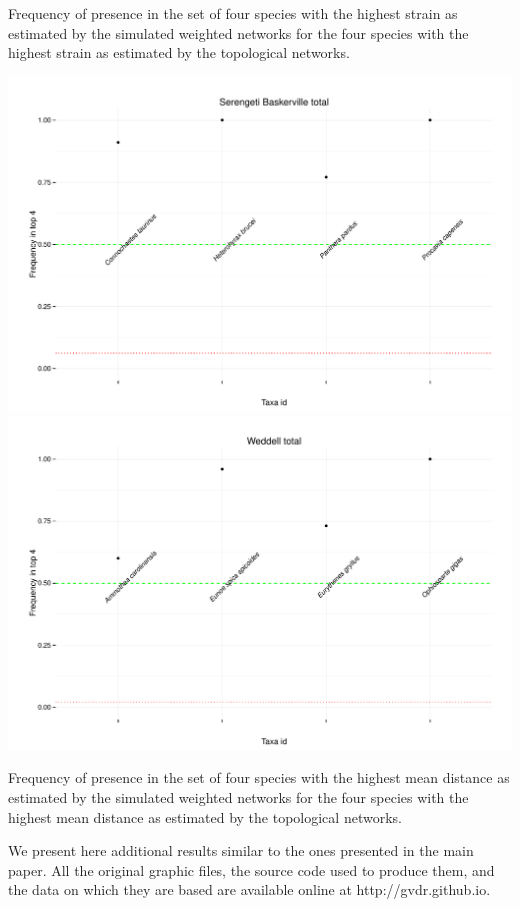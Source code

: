 \documentclass[11pt,article,oneside]{memoir}
\makeatletter
\def\maxwidth{\ifdim\Gin@nat@width>\linewidth\linewidth
\else\Gin@nat@width\fi}
\let\Oldincludegraphics\includegraphics
\renewcommand{\includegraphics}[1]{\Oldincludegraphics[width=\maxwidth]{#1}}
\makeatother
\begin{document}
Frequency of presence in the set of four species with the highest strain
as estimated by the simulated weighted networks for the four species
with the highest strain as estimated by the topological networks.

\newpage

\includegraphics{Images/meand_weight/Serengeti_Baskerville_total.pdf}
\includegraphics{Images/meand_weight/Weddell_total.pdf}

Frequency of presence in the set of four species with the highest mean
distance as estimated by the simulated weighted networks for the four
species with the highest mean distance as estimated by the topological
networks.

\newpage

We present here additional results similar to the ones presented in the
main paper. All the original graphic files, the source code used to
produce them, and the data on which they are based are available online
at http://gvdr.github.io.
\end{document}
